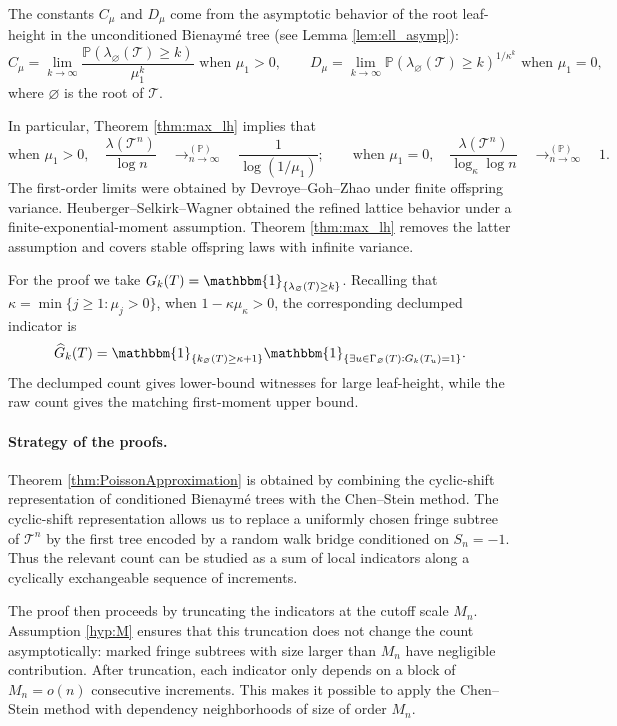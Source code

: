 \documentclass[a4paper,11pt]{article}
\DeclareRobustCommand{\P}{\mathbb{P}}
\DeclareRobustCommand{\1}{\mathbf{1}}
\begin{document}
The constants $C_{\mu}$ and $D_{\mu}$ come from the asymptotic behavior of the
root leaf-height in the unconditioned Bienaym\'e tree (see Lemma
\ref{lem:ell_asymp}):
$$C_\mu
=
\lim_{k\to\infty}\frac{\P(\lambda_\varnothing( \mathcal{T}) \geq k)}{\mu_1^k} \textrm{ when } \mu_1>0, \qquad
D_\mu
=
\lim_{k\to\infty}\P(\lambda_\varnothing( \mathcal{T}) \geq k)^{1/\kappa^k}  \textrm{ when } \mu_1=0,
$$
where $\varnothing$ is the root of $\mathcal{T}$.

In particular, Theorem \ref{thm:max_lh} implies that
$$
\textrm{when } \mu_{1}>0, \quad  \frac{\lambda(\mathcal T^n)}{\log n}
 \quad \mathop{\longrightarrow}^{(\P)}_{n \rightarrow \infty} \quad 
\frac{1}{\log(1/\mu_1)}; \qquad 
\textrm{when } \mu_{1}=0,   \quad \frac{\lambda(\mathcal T^n)}{\log_\kappa\log n}
 \quad \mathop{\longrightarrow}^{(\P)}_{n \rightarrow \infty} \quad 1.
$$
The first-order limits were obtained by Devroye--Goh--Zhao \cite{DGZ23} under
finite offspring variance. Heuberger--Selkirk--Wagner \cite{HSW24} obtained the
refined lattice behavior under a finite-exponential-moment assumption. Theorem
\ref{thm:max_lh} removes the latter assumption and covers stable offspring laws
with infinite variance.

For the proof  we take
$G_k(T)=\mathbbm{1}_{\{\lambda_\varnothing(T)\ge k\}}$.
Recalling that $\kappa=\min\{j\ge1:\mu_j>0\}$, when $1-\kappa\mu_\kappa>0$, the corresponding declumped indicator is
$$\widehat G_k(T)
=
\mathbbm{1}_{\{k_\varnothing(T)\ge\kappa+1\}}
\mathbbm{1}_{\{\exists u\in\Gamma_\varnothing(T):G_k(T_u)=1\}}.
$$
The declumped count gives lower-bound witnesses for large leaf-height, while
the raw count gives the matching first-moment upper bound.



\paragraph{Strategy of the proofs.}
Theorem \ref{thm:PoissonApproximation} is obtained by combining the
cyclic-shift representation of conditioned Bienaym\'e trees with the
Chen--Stein method. The cyclic-shift representation allows us to replace a
uniformly chosen fringe subtree of $\mathcal T^n$ by the first tree encoded by
a random walk bridge conditioned on $S_n=-1$. Thus the relevant count can be
studied as a sum of local indicators along a cyclically exchangeable sequence
of increments.

The proof then proceeds by truncating the indicators at the cutoff scale
$M_n$. Assumption \ref{hyp:M} ensures that this truncation does not change the
count asymptotically: marked fringe subtrees with size larger than $M_n$ have
negligible contribution. After truncation, each indicator only depends on a
block of $M_n=o(n)$ consecutive increments. This makes it possible to apply the
Chen--Stein method with dependency neighborhoods of size of order $M_n$.
\end{document}
